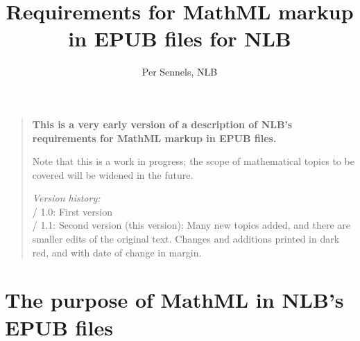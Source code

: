 \documentclass[english,a4paper,11pt]{article}
\title{Requirements for MathML markup\\ in EPUB files for NLB}
\author{Per Sennels, NLB}
\begin{document}
	\bunntekst
	\thispagestyle{empty}
	\raggedright
	
	\maketitle
	\thispagestyle{empty}
	\vfill
	\begin{quote}
		{\bfseries This is a very early version of a description of NLB's requirements for MathML markup in EPUB files.
		\smallskip
		
		Note that this is a work in progress; the scope of mathematical topics to be covered will  be widened in the future. }
	
		\bigskip
		\emph{Version history:}\\
		\textbullet{} / 1.0: First version\\
		\textbullet{} / 1.1: Second version (this version): Many new topics added, and there are smaller edits of the original text. \textcolor{endretInnhold}{Changes and additions printed in dark red, and with date of change in margin.}
	\end{quote}
	\vfill
	\pagebreak
	\tableofcontents
	\pagebreak

\section{The purpose of MathML in NLB's EPUB files}
\end{document}

